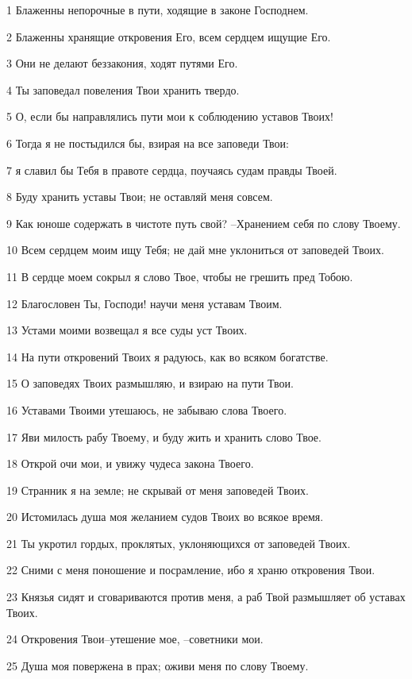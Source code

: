 \par 1 Блаженны непорочные в пути, ходящие в законе Господнем.
\par 2 Блаженны хранящие откровения Его, всем сердцем ищущие Его.
\par 3 Они не делают беззакония, ходят путями Его.
\par 4 Ты заповедал повеления Твои хранить твердо.
\par 5 О, если бы направлялись пути мои к соблюдению уставов Твоих!
\par 6 Тогда я не постыдился бы, взирая на все заповеди Твои:
\par 7 я славил бы Тебя в правоте сердца, поучаясь судам правды Твоей.
\par 8 Буду хранить уставы Твои; не оставляй меня совсем.
\par 9 Как юноше содержать в чистоте путь свой? --Хранением себя по слову Твоему.
\par 10 Всем сердцем моим ищу Тебя; не дай мне уклониться от заповедей Твоих.
\par 11 В сердце моем сокрыл я слово Твое, чтобы не грешить пред Тобою.
\par 12 Благословен Ты, Господи! научи меня уставам Твоим.
\par 13 Устами моими возвещал я все суды уст Твоих.
\par 14 На пути откровений Твоих я радуюсь, как во всяком богатстве.
\par 15 О заповедях Твоих размышляю, и взираю на пути Твои.
\par 16 Уставами Твоими утешаюсь, не забываю слова Твоего.
\par 17 Яви милость рабу Твоему, и буду жить и хранить слово Твое.
\par 18 Открой очи мои, и увижу чудеса закона Твоего.
\par 19 Странник я на земле; не скрывай от меня заповедей Твоих.
\par 20 Истомилась душа моя желанием судов Твоих во всякое время.
\par 21 Ты укротил гордых, проклятых, уклоняющихся от заповедей Твоих.
\par 22 Сними с меня поношение и посрамление, ибо я храню откровения Твои.
\par 23 Князья сидят и сговариваются против меня, а раб Твой размышляет об уставах Твоих.
\par 24 Откровения Твои--утешение мое, --советники мои.
\par 25 Душа моя повержена в прах; оживи меня по слову Твоему.
